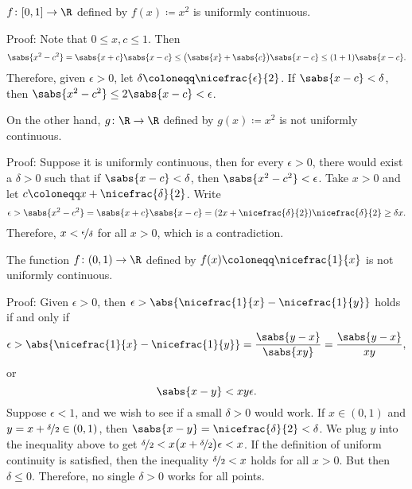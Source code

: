 \begin{example}
$f \colon [0,1] \to \R$ defined by $f(x) \coloneqq x^2$ is uniformly continuous.

Proof: Note that $0 \leq x,c \leq 1$.  Then
\begin{equation*}
\sabs{x^2-c^2} = \sabs{x+c}\sabs{x-c}
\leq \bigl(\sabs{x}+\sabs{c}\bigr) \sabs{x-c}
\leq (1+1)\sabs{x-c} .
\end{equation*}
Therefore, given $\epsilon > 0$, let $\delta \coloneqq \nicefrac{\epsilon}{2}$.
If $\sabs{x-c} < \delta$, then $\sabs{x^2-c^2} \leq 2 \sabs{x-c} < \epsilon$.

\medskip

On the other hand, $g \colon \R \to \R$ defined by $g(x) \coloneqq x^2$ is not uniformly
continuous.

Proof: Suppose it is uniformly continuous, then for every $\epsilon > 0$,
there would exist a $\delta > 0$ such that
if $\sabs{x-c} < \delta$, then $\sabs{x^2 -c^2} < \epsilon$.
Take $x > 0$ and let
$c \coloneqq x+\nicefrac{\delta}{2}$.  Write
\begin{equation*}
\epsilon >
\sabs{x^2-c^2} = \sabs{x+c}\sabs{x-c}
=
(2x+\nicefrac{\delta}{2})\nicefrac{\delta}{2} 
\geq 
\delta x .
\end{equation*}
Therefore, $x < \nicefrac{\epsilon}{\delta}$ for all $x > 0$, which is a
contradiction.
\end{example}


\begin{example}
The function $f \colon (0,1) \to \R$ defined by $f(x) \coloneqq \nicefrac{1}{x}$ is not
uniformly continuous.

Proof: Given $\epsilon > 0$, then $\epsilon >
\abs{\nicefrac{1}{x}-\nicefrac{1}{y}}$ holds if and only if
\begin{equation*}
\epsilon >
\abs{\nicefrac{1}{x}-\nicefrac{1}{y}}
=
\frac{\sabs{y-x}}{\sabs{xy}} 
=
\frac{\sabs{y-x}}{xy} ,
\end{equation*}
or
\begin{equation*}
\sabs{x-y} < xy \epsilon .
\end{equation*}
Suppose $\epsilon < 1$, and we wish to see if a 
small $\delta > 0$ would work.
If $x \in (0,1)$ and 
$y = x+\nicefrac{\delta}{2} \in (0,1)$,
then $\sabs{x-y} = \nicefrac{\delta}{2} < \delta$.
We plug $y$ into the inequality above to get $\nicefrac{\delta}{2} <
x \bigl( x+\nicefrac{\delta}{2} \bigr) \epsilon < x$.
If the definition of uniform continuity is satisfied, then
the inequality $\nicefrac{\delta}{2} < x$ holds for all $x > 0$.   But then $\delta \leq 0$.
Therefore, no single $\delta > 0$ works for all points.
\end{example}

